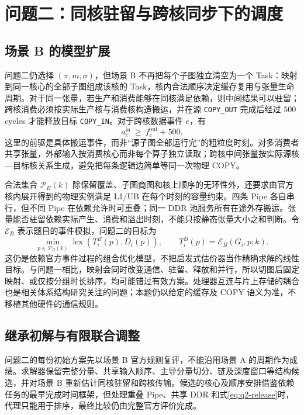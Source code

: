 \section{问题二：同核驻留与跨核同步下的调度}
\subsection{场景 B 的模型扩展}
问题二仍选择 $(\pi,m,\sigma)$，但场景 B 不再把每个子图独立清空为一个 Task：映射到同一核心的全部子图组成该核的 Task，核内合法顺序决定缓存复用与张量生命周期。对于同一张量，若生产和消费能够在同核满足依赖，则中间结果可以驻留；跨核消费必须按实际生产核与消费核构造搬运，并在源 \texttt{COPY\_OUT} 完成后经过 $500$ cycles 才能释放目标 \texttt{COPY\_IN}。对于跨核数据事件 $e$，有
\begin{equation}\label{eq:q2-release}
a_e^{\mathrm{in}}\ \ge\ f_e^{\mathrm{out}}+500.
\end{equation}
这里的前驱是具体搬运事件，而非“源子图全部运行完”的粗粒度时刻。对多消费者共享张量，外部输入按消费核心而非每个算子独立读取；跨核中间张量按实际源核—目标核关系生成，避免把每条逻辑边简单等同一次物理 COPY。

合法集合 $\mathcal P_B(k)$ 除保留覆盖、子图商图和核上顺序的无环性外，还要求由官方核内展开得到的物理实例满足 L1/UB 在每个时刻的容量约束。四条 Pipe 各自串行，但不同 Pipe 在依赖允许时可重叠；同一 DDR 池服务所有在途外存搬运。张量能否驻留依赖实际产生、消费和溢出时刻，不能只按静态张量大小之和判断。令 $\mathcal E_B$ 表示题目的事件模拟，问题二的目标为
\begin{equation}\label{eq:q2-objective}
\min_{p\in\mathcal P_B(k)}
\operatorname{lex}\left(T_i^B(p),D_i(p)\right),\qquad
T_i^B(p)=\mathcal E_B(G_i,p;k).
\end{equation}
这仍是依赖官方事件过程的组合优化模型，不把启发式估价器当作精确求解的线性目标。与问题一相比，映射会同时改变通信、驻留、释放和并行，所以切图后固定映射、或仅按分组时长排序，均可能错过有效方案。处理器互连与片上存储的耦合也是相关体系结构研究关注的问题\cite{t10}；本题仍以给定的缓存及 COPY 语义为准，不移植其他硬件的通信规则。


\subsection{继承初解与有限联合调整}
问题二的每份初始方案先以场景 B 官方规则复评，不能沿用场景 A 的周期作为成绩。求解器保留完整分量、共享输入顺序、主导分量切分、链及深度窗口等结构候选，并对场景 B 重新估计同核驻留和跨核传输。候选的核心及顺序安排借鉴依赖任务的最早完成时间框架，但处理重叠 Pipe、共享 DDR 和式\eqref{eq:q2-release}时，代理只能用于排序，最终比较仍由完整官方评价完成。

